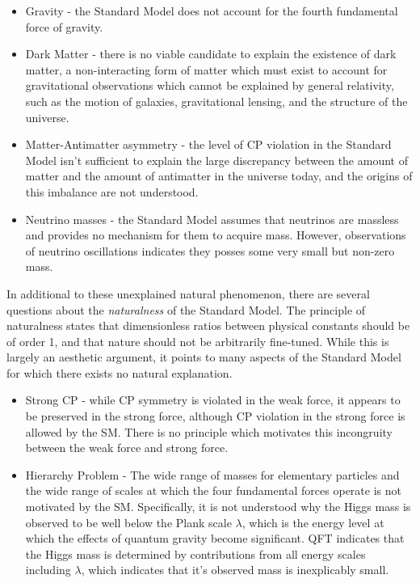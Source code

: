 \begin{itemize}
  \item Gravity - the Standard Model does not account for the fourth fundamental force of gravity.
  \item Dark Matter - there is no viable candidate to explain the existence of dark matter, a non-interacting form of matter which must exist to account for gravitational observations which cannot be explained by general relativity, such as the motion of galaxies, gravitational lensing, and the structure of the universe.
  \item Matter-Antimatter asymmetry - the level of CP violation in the Standard Model isn't sufficient to explain the large discrepancy between the amount of matter and the amount of antimatter in the universe today, and the origins of this imbalance are not understood.
  \item Neutrino masses - the Standard Model assumes that neutrinos are massless and provides no mechanism for them to acquire mass. However, observations of neutrino oscillations indicates they posses some very small but non-zero mass.
\end{itemize}

In additional to these unexplained natural phenomenon, there are several questions about the \textit{naturalness} of the Standard Model. The principle of naturalness states that dimensionless ratios between physical constants should be of order 1, and that nature should not be arbitrarily fine-tuned. While this is largely an aesthetic argument, it points to many aspects of the Standard Model for which there exists no natural explanation.

\begin{itemize}
  \item Strong CP - while CP symmetry is violated in the weak force, it appears to be preserved in the strong force, although CP violation in the strong force is allowed by the SM. There is no principle which motivates this incongruity between the weak force and strong force.
  \item Hierarchy Problem - The wide range of masses for elementary particles and the wide range of scales at which the four fundamental forces operate is not motivated by the SM. Specifically, it is not understood why the Higgs mass is observed to be well below the Plank scale $\lambda$, which is the energy level at which the effects of quantum gravity become significant. QFT indicates that the Higgs mass is determined by contributions from all energy scales including $\lambda$, which indicates that it's observed mass is inexplicably small.
\end{itemize}

